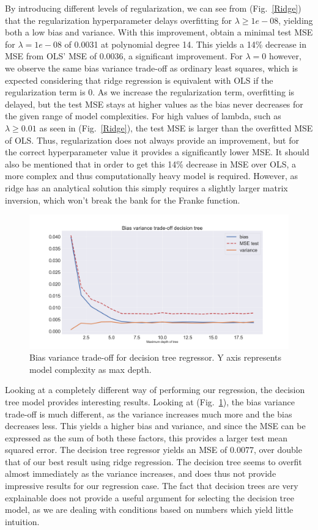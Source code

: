 \documentclass[onecolumn,10pt,cleanfoot]{asme2ej}
\begin{document}
By introducing different levels of regularization, we can see from (Fig.~\ref{Ridge}) that the regularization hyperparameter delays overfitting for $\lambda \geq 1e-08$, yielding both a low bias and variance. With this improvement, obtain a minimal test MSE for $\lambda = 1e-08$ of 0.0031 at polynomial degree 14. This yields a 14\% decrease in MSE from OLS' MSE of 0.0036, a significant improvement. For $\lambda = 0$ however, we observe the same bias variance trade-off as ordinary least squares, which is expected considering that ridge regression is equivalent with OLS if the regularization term is 0. As we increase the regularization term, overfitting is delayed, but the test MSE stays at higher values as the bias never decreases for the given range of model complexities. For high values of lambda, such as $\lambda \geq 0.01$ as seen in (Fig.~\ref{Ridge}), the test MSE is larger than the overfitted MSE of  OLS. Thus, regularization does not always provide an improvement, but for the correct hyperparameter value it provides a significantly lower MSE. It should also be mentioned that in order to get this 14\% decrease in MSE over OLS, a more complex and thus computationally heavy model is required. However, as ridge has an analytical solution this simply requires a slightly larger matrix inversion, which won't break the bank for the Franke function.

\begin{figure}[H]
\centerline{\includegraphics[width=5in]{figs/BV_Decison_tree.png}}
\caption{Bias variance trade-off for decision tree regressor. Y axis represents model complexity as max depth.}
\label{tree}
\end{figure}

Looking at a completely different way of performing our regression, the decision tree model provides interesting results. Looking at (Fig.~\ref{tree}), the bias variance trade-off is much different, as the variance increases much more and the bias decreases less. This yields a higher bias and variance, and since the MSE can be expressed as the sum of both these factors, this provides a larger test mean squared error. The decision tree regressor yields an MSE of 0.0077, over double that of our best result using ridge regression. The decision tree seems to overfit almost immediately as the variance increases, and does thus not provide impressive results for our regression case. The fact that decision trees are very explainable does not provide a useful argument for selecting the decision tree model, as we are dealing with conditions based on numbers which yield little intuition.
\end{document}
